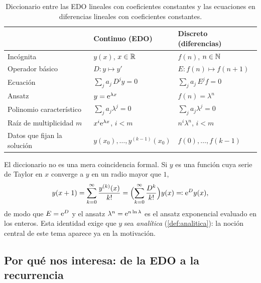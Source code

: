 \begin{table}[ht]
\centering
\caption{Diccionario entre las EDO lineales con coeficientes constantes y
las ecuaciones en diferencias lineales con coeficientes constantes.}
\label{tab:analogia}
\renewcommand{\arraystretch}{1.35}
\begin{tabular}{@{}l>{\centering\arraybackslash}p{4.6cm}>{\centering\arraybackslash}p{4.6cm}@{}}
\toprule
 & \textcolor{cian}{\bfseries Continuo (EDO)} & \textcolor{cian}{\bfseries Discreto (diferencias)}\\
\midrule
Incógnita            & $y(x)$, $x\in\mathbb{R}$                     & $f(n)$, $n\in\mathbb{N}$\\
Operador básico      & $D\colon y\mapsto y'$                & $E\colon f(n)\mapsto f(n+1)$\\
Ecuación             & $\sum_{j} a_j\,D^{j}y=0$             & $\sum_{j} a_j\,E^{j}f=0$\\
Ansatz               & $y=\mathrm{e}^{\lambda x}$                 & $f(n)=\lambda^{n}$\\
Polinomio característico & $\sum_j a_j\lambda^j=0$          & $\sum_j a_j\lambda^j=0$\\
Raíz de multiplicidad $m$ & $x^{i}\mathrm{e}^{\lambda x}$, $i<m$  & $n^{i}\lambda^{n}$, $i<m$\\
Datos que fijan la solución & $y(x_0),\dots,y^{(k-1)}(x_0)$ & $f(0),\dots,f(k-1)$\\
\bottomrule
\end{tabular}
\end{table}

\begin{observacion}[$E=\eul^{D}$]\label{obs:E-expD}
El diccionario no es una mera coincidencia formal. Si $y$ es una función
cuya serie de Taylor en $x$ converge a $y$ en un radio mayor que $1$,
\[
  y(x+1)=\sum_{k=0}^{\infty}\frac{y^{(k)}(x)}{k!}
        =\Bigl(\sum_{k=0}^{\infty}\frac{D^{k}}{k!}\Bigr)y(x)
        \eqqcolon \mathrm{e}^{D}y(x),
\]
de modo que $E=\eul^{D}$ y el ansatz $\lambda^n=\mathrm{e}^{n\ln\lambda}$ es el
ansatz exponencial evaluado en los enteros. Esta identidad exige que $y$ sea
\emph{analítica} (\cref{def:analitica}): la noción central de este tema
aparece ya en la motivación.
\end{observacion}

\subsection{Por qué nos interesa: de la EDO a la recurrencia}\label{sec:por-que}

